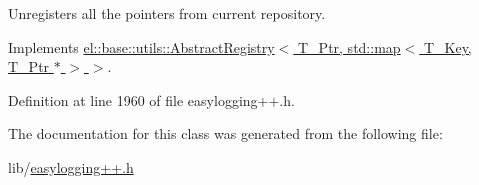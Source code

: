 Unregisters all the pointers from current repository. 



Implements \hyperlink{classel_1_1base_1_1utils_1_1_abstract_registry_a19223bc1fea48dbe6b47b4879aa4672f}{el\+::base\+::utils\+::\+Abstract\+Registry$<$ T\+\_\+\+Ptr, std\+::map$<$ T\+\_\+\+Key, T\+\_\+\+Ptr $\ast$ $>$ $>$}.



Definition at line 1960 of file easylogging++.\+h.



The documentation for this class was generated from the following file\+:\begin{DoxyCompactItemize}
\item 
lib/\hyperlink{easylogging_09_09_8h}{easylogging++.\+h}\end{DoxyCompactItemize}
